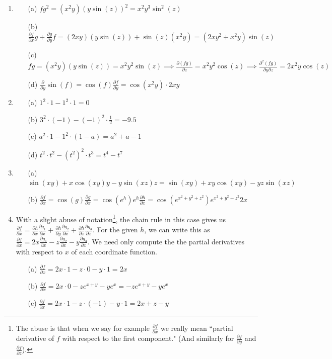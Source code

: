 \documentclass[12pt]{article}
\numberwithin{theorem}{section}
\numberwithin{equation}{section}
\numberwithin{remark}{section}
\numberwithin{definition}{section}
\numberwithin{theorem}{section}
\numberwithin{lemma}{section}
\numberwithin{example}{section}
\begin{document}
\begin{enumerate}
	\item{
		\begin{enumerate}
			\item[(a)]{$fg^2=(x^2y)(y\sin(z))^2=x^2y^3\sin^2(z)$}
			\item[(b)]{$\frac{\partial f}{\partial x}g+\frac{\partial g}{\partial y}f=(2xy)(y\sin(z))+\sin(z)(x^2y)=(2xy^2+x^2y)\sin(z)$}
			\item[(c)]{$fg=(x^2y)(y\sin(z))=x^2y^2\sin(z)\implies\frac{\partial (fg)}{\partial z}=x^2y^2\cos(z)\implies\frac{\partial^2 (fg)}{\partial y \partial z}=2x^2y\cos(z)$}
			\item[(d)]{$\frac{\partial}{\partial y}\sin(f)=\cos(f)\frac{\partial f}{\partial y}=\cos(x^2y)\cdot2xy$}
		\end{enumerate}
	}
	\item{
		\begin{enumerate}
			\item[(a)]{$1^2\cdot1-1^2\cdot1=0$}
			\item[(b)]{$3^2\cdot(-1)-(-1)^2\cdot\frac{1}{2}=-9.5$}
			\item[(c)]{$a^2\cdot1-1^2\cdot(1-a)=a^2+a-1$}
			\item[(d)]{$t^2\cdot t^2-(t^2)^2\cdot t^3=t^4-t^7$}
		\end{enumerate}
	}
	\item{
		\begin{enumerate}
			\item[(a)]{$\sin(xy)+x\cos(xy)y-y\sin(xz)z=\sin(xy)+xy\cos(xy)-yz\sin(xz)$}
			\item[(b)]{$\frac{\partial f}{\partial x}=\cos(g)\frac{\partial g}{\partial x}=\cos(e^h)e^h\frac{\partial h}{\partial x}=\cos(e^{x^2+y^2+z^2})e^{x^2+y^2+z^2}2x$}
		\end{enumerate}
	}
	\item{
		With a slight abuse of notation\footnote{The abuse is that when we say for example $\frac{\partial f}{\partial x}$ we really mean ``partial derivative of $f$ with respect to the first component." (And similarly for $\frac{\partial f}{\partial y}$ and $\frac{\partial f}{\partial z}$).}, the chain rule in this case gives us $\frac{\partial f}{\partial x}=\frac{\partial h}{\partial x}\frac{\partial g_1}{\partial x}+\frac{\partial h}{\partial y}\frac{\partial g_2}{\partial x}+\frac{\partial h}{\partial z}\frac{\partial g_3}{\partial x}$. For the given $h$, we can write this as $\frac{\partial f}{\partial x}=2x\frac{\partial g_1}{\partial x}-z\frac{\partial g_2}{\partial x}-y\frac{\partial g_3}{\partial x}.$ We need only compute the the partial derivatives with respect to $x$ of each coordinate function.
		\begin{enumerate}
			\item[(a)]{$\frac{\partial f}{\partial x}=2x\cdot 1-z\cdot 0-y\cdot 1=2x$}
			\item[(b)]{$\frac{\partial f}{\partial x}=2x\cdot 0-ze^{x+y}-ye^x=-ze^{x+y}-ye^x$}
			\item[(c)]{$\frac{\partial f}{\partial x}=2x\cdot 1-z\cdot (-1)-y\cdot 1 = 2x+z-y$}
		\end{enumerate}
	}
\end{enumerate}
\end{document}
